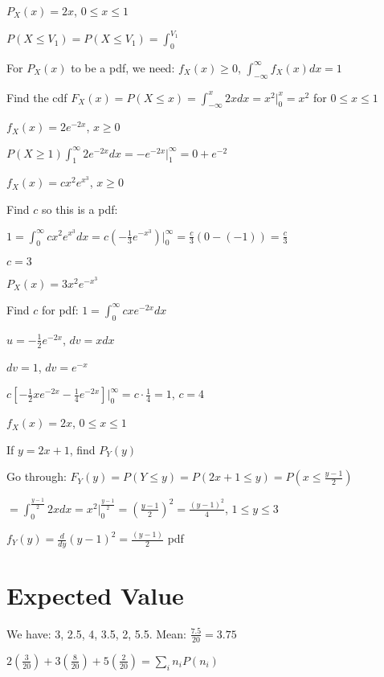 \begin{example}
$P_X(x) = 2x$, $0 \leq x \leq 1$

$P(X \leq V_1) = P(X \leq V_1) = \int_0^{V_1}$
\end{example}

\begin{definition}
For $P_X(x)$ to be a pdf, we need: $f_X(x) \geq 0$, $\int_{-\infty}^{\infty} f_X(x) dx = 1$
\end{definition}

Find the cdf $F_X(x) = P(X \leq x) = \int_{-\infty}^x 2x dx = x^2 \Big|_0^x = x^2$ for $0 \leq x \leq 1$

\begin{example}
$f_X(x) = 2e^{-2x}$, $x \geq 0$

$P(X \geq 1) \int_1^{\infty} 2e^{-2x} dx = -e^{-2x} \Big|_1^{\infty} = 0 + e^{-2}$
\end{example}

$f_X(x) = cx^2 e^{x^3}$, $x \geq 0$

Find $c$ so this is a pdf:

$1 = \int_0^{\infty} cx^2 e^{x^3} dx = c\left(-\frac{1}{3} e^{-x^3}\right) \Big|_0^{\infty} = \frac{c}{3} (0 - (-1)) = \frac{c}{3}$

$c = 3$

$P_X(x) = 3x^2 e^{-x^3}$

Find $c$ for pdf: $1 = \int_0^{\infty} c x e^{-2x} dx$

$u = -\frac{1}{2} e^{-2x}$, $dv = x dx$

$dv = 1$, $dv = e^{-x}$

$c\left[-\frac{1}{2} x e^{-2x} - \frac{1}{4} e^{-2x}\right] \Big|_0^{\infty} = c \cdot \frac{1}{4} = 1$, $c = 4$

$f_X(x) = 2x$, $0 \leq x \leq 1$

If $y = 2x + 1$, find $P_Y(y)$

Go through: $F_Y(y) = P(Y \leq y) = P(2x + 1 \leq y) = P\left(x \leq \frac{y-1}{2}\right)$

$= \int_0^{\frac{y-1}{2}} 2x dx = x^2 \Big|_0^{\frac{y-1}{2}} = \left(\frac{y-1}{2}\right)^2 = \frac{(y-1)^2}{4}$, $1 \leq y \leq 3$

$f_Y(y) = \frac{d}{dy}(y-1)^2 = \frac{(y-1)}{2}$ pdf

\section{Expected Value}

\begin{example}
We have: 3, 2.5, 4, 3.5, 2, 5.5. Mean: $\frac{7.5}{20} = 3.75$

$2\left(\frac{3}{20}\right) + 3\left(\frac{8}{20}\right) + 5\left(\frac{2}{20}\right) = \sum_{i} n_i P(n_i)$
\end{example}

